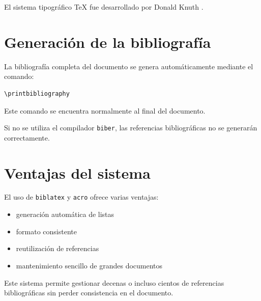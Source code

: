 \begin{examplebox}
El sistema tipográfico \TeX{} fue desarrollado por
Donald Knuth \cite{knuth1984}.
\end{examplebox}




\section{Generación de la bibliografía}

La bibliografía completa del documento se genera
automáticamente mediante el comando:

\begin{lstlisting}[caption={Generación de bibliografía},label={code:bibliography}]
\printbibliography
\end{lstlisting}




Este comando se encuentra normalmente al final del
documento.



\begin{warningbox}
Si no se utiliza el compilador \texttt{biber},
las referencias bibliográficas no se generarán
correctamente.
\end{warningbox}




\section{Ventajas del sistema}

El uso de \texttt{biblatex} y \texttt{acro} ofrece
varias ventajas:

\begin{itemize}

\item generación automática de listas
\item formato consistente
\item reutilización de referencias
\item mantenimiento sencillo de grandes documentos

\end{itemize}



\begin{examplebox}
Este sistema permite gestionar decenas o incluso
cientos de referencias bibliográficas sin perder
consistencia en el documento.
\end{examplebox}
